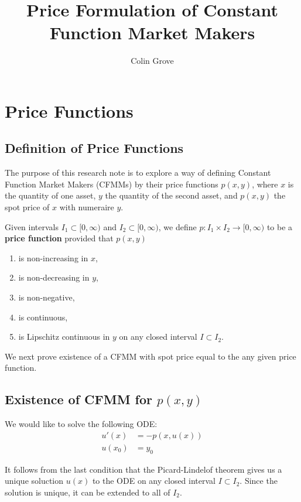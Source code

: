 \documentclass[11pt]{article} %
\title{Price Formulation of Constant Function Market Makers}
\author{Colin Grove}
\affil{HydraDX}
\date{} %
\begin{document}
\maketitle

\section{Price Functions}

\subsection{Definition of Price Functions}

The purpose of this research note is to explore a way of defining Constant Function Market Makers (CFMMs) by their price functions $p(x,y)$, where $x$ is the quantity of one asset, $y$ the quantity of the second asset, and $p(x,y)$ the spot price of $x$ with numeraire $y$.

Given intervals $I_1\subset [0,\infty)$ and $I_2\subset [0,\infty)$, we define $p:I_1 \times I_2 \to [0,\infty)$ to be a \textbf{price function} provided that $p(x,y)$
\begin{enumerate}
\item is non-increasing in $x$,
\item is non-decreasing in $y$,
\item is non-negative,
\item is continuous,
\item is Lipschitz continuous in $y$ on any closed interval $I \subset I_2$.
\end{enumerate}

We next prove existence of a CFMM with spot price equal to the any given price function.

\subsection{Existence of CFMM for $p(x,y)$}

We would like to solve the following ODE:
\begin{align*}
u'(x) &= -p(x,u(x))\\
u(x_0) &= y_0
\end{align*}

It follows from the last condition that the Picard-Lindelof theorem gives us a unique soluction $u(x)$ to the ODE on any closed interval $I\subset I_2$.
Since the solution is unique, it can be extended to all of $I_2$.
\end{document}
